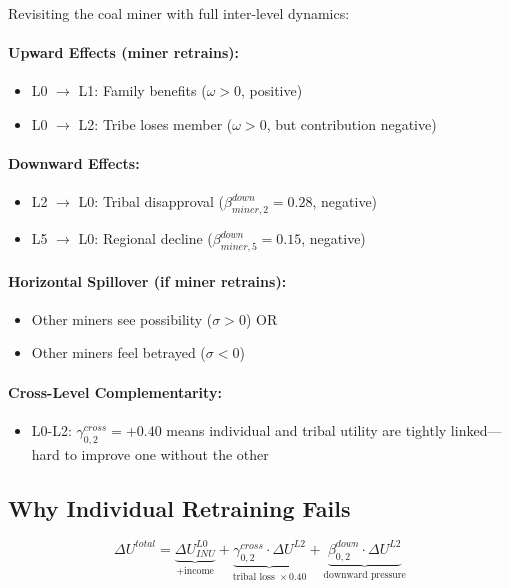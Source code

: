 Revisiting the coal miner with full inter-level dynamics:

\paragraph{Upward Effects (miner retrains):}
\begin{itemize}
\item L0 $\to$ L1: Family benefits ($\omega > 0$, positive)
\item L0 $\to$ L2: Tribe loses member ($\omega > 0$, but contribution negative)
\end{itemize}

\paragraph{Downward Effects:}
\begin{itemize}
\item L2 $\to$ L0: Tribal disapproval ($\beta^{down}_{miner,2} = 0.28$, negative)
\item L5 $\to$ L0: Regional decline ($\beta^{down}_{miner,5} = 0.15$, negative)
\end{itemize}

\paragraph{Horizontal Spillover (if miner retrains):}
\begin{itemize}
\item Other miners see possibility ($\sigma > 0$) OR
\item Other miners feel betrayed ($\sigma < 0$)
\end{itemize}

\paragraph{Cross-Level Complementarity:}
\begin{itemize}
\item L0-L2: $\gamma^{cross}_{0,2} = +0.40$ means individual and tribal utility
are tightly linked---hard to improve one without the other
\end{itemize}

\subsection{Why Individual Retraining Fails}

\begin{equation}
\Delta U^{total} = \underbrace{\Delta U^{L0}_{INU}}_{\text{+income}} 
+ \underbrace{\gamma^{cross}_{0,2} \cdot \Delta U^{L2}}_{\text{tribal loss } \times 0.40}
+ \underbrace{\beta^{down}_{0,2} \cdot \Delta U^{L2}}_{\text{downward pressure}}
\end{equation}

